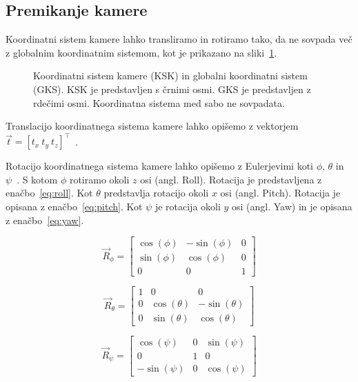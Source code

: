 \subsection{Premikanje kamere}
Koordinatni sistem kamere lahko transliramo in rotiramo tako, da ne sovpada več z globalnim koordinatnim sistemom, kot je prikazano na sliki~\ref{fig:premikanje-kamere}. 

\begin{figure}[htb]
\centering

\caption[Koordinatni sistem kamere in globalni koordinatni sistem]{Koordinatni sistem kamere (KSK) in globalni koordinatni sistem (GKS). KSK je predstavljen s črnimi osmi. GKS je predstavljen z rdečimi osmi. Koordinatna sistema med sabo ne sovpadata.}
\label{fig:premikanje-kamere}
\end{figure}

Translacijo koordinatnega sistema kamere lahko opišemo z vektorjem $\vec{t} = \left[t_x~t_y~t_z\right]^\top$~\cite{trucco1998introductory}. 

Rotacijo koordinatnega sistema kamere lahko opišemo z Eulerjevimi koti $\phi$, $\theta$ in $\psi$~\cite{bajd2011osnove}. S kotom $\phi$ rotiramo okoli $z$ osi (angl. Roll). Rotacija je predstavljena z enačbo~\eqref{eq:roll}. Kot $\theta$ predstavlja rotacijo okoli $x$ osi (angl. Pitch). Rotacija je opisana z enačbo~\eqref{eq:pitch}. Kot $\psi$ je rotacija okoli $y$ osi (angl. Yaw) in je opisana z enačbo~\eqref{eq:yaw}.

\begin{equation}
\vec{R}_\phi = \begin{bmatrix}
\cos(\phi) & - \sin(\phi) & 0 \\
\sin(\phi) & \cos(\phi) & 0 \\
0 & 0 & 1
\end{bmatrix}
\label{eq:roll}
\end{equation}

\begin{equation}
\vec{R}_\theta = \begin{bmatrix}
1 & 0 & 0 \\
0 & \cos(\theta) & - \sin(\theta) \\
0 & \sin(\theta) & \cos(\theta)
\end{bmatrix}
\label{eq:pitch}
\end{equation}

\begin{equation}
\vec{R}_\psi = \begin{bmatrix}
\cos(\psi) & 0 & \sin(\psi) \\
0 & 1 & 0 \\
- \sin(\psi) & 0 & \cos(\psi) 
\end{bmatrix}
\label{eq:yaw}
\end{equation}


